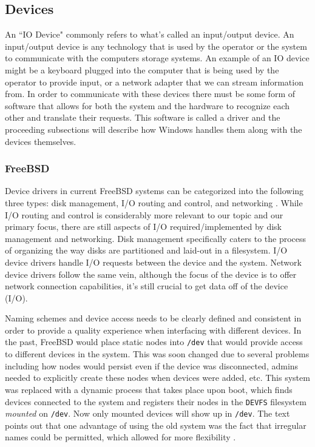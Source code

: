 \subsection{Devices}
\label{sec:Devices}
\par An ``IO Device" commonly refers to what's called an input/output device.
An input/output device is any technology that is used by the operator or the system to communicate with the computers storage systems.
An example of an IO device might be a keyboard plugged into the computer that is being used by the operator to provide input, or a network adapter that we can stream information from.
In order to communicate with these devices there must be some form of software that allows for both the system and the hardware to recognize each other and translate their requests.
This software is called a driver and the proceeding subsections will describe how Windows handles them along with the devices themselves.

\subsubsection{FreeBSD}
\label{sub:Devices FreeBSD}
\par Device drivers in current FreeBSD systems can be categorized into the following three types: disk management, I/O routing and control, and networking \cite{bsd:1}.
While I/O routing and control is considerably more relevant to our topic and our primary focus, there are still aspects of I/O required/implemented by disk management and networking.
Disk management specifically caters to the process of organizing the way disks are partitioned and laid-out in a filesystem.
I/O device drivers handle I/O requests between the device and the system.
Network device drivers follow the same vein, although the focus of the device is to offer network connection capabilities, it's still crucial to get data off of the device (I/O).

\par Naming schemes and device access needs to be clearly defined and consistent in order to provide a quality experience when interfacing with different devices.
In the past, FreeBSD would place static nodes into \texttt{/dev} that would provide access to different devices in the system.
This was soon changed due to several problems including how nodes would persist even if the device was disconnected, admins needed to explicitly create these nodes when devices were added, etc.
This system was replaced with a dynamic process that takes place upon boot, which finds devices connected to the system and registers their nodes in the \texttt{DEVFS} filesystem \textit{mounted} on \texttt{/dev}.
Now only mounted devices will show up in \texttt{/dev}.
The text points out that one advantage of using the old system was the fact that irregular names could be permitted, which allowed for more flexibility \cite{bsd:1}.

